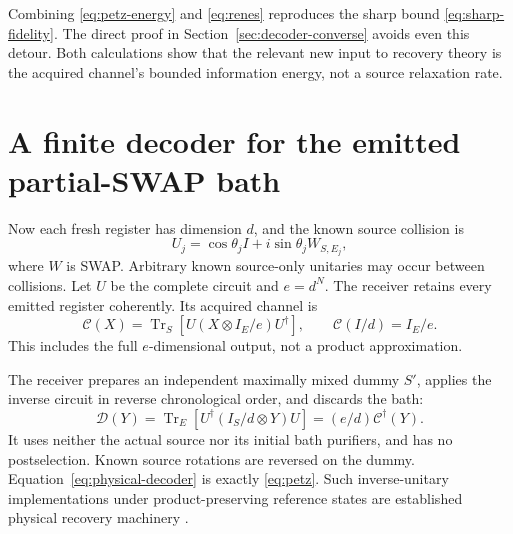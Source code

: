 \documentclass[11pt]{article}
\numberwithin{equation}{section}
\theoremstyle{remark}
\newcommand{\Tr}{\operatorname{Tr}}
\newcommand{\Ccal}{\mathcal C}
\newcommand{\Dcal}{\mathcal D}
\begin{document}
Combining \eqref{eq:petz-energy} and \eqref{eq:renes} reproduces the sharp
bound \eqref{eq:sharp-fidelity}. The direct proof in
Section~\ref{sec:decoder-converse} avoids even this detour. Both calculations
show that the relevant new input to recovery theory is the acquired
channel's bounded information energy, not a source relaxation rate.

\section{A finite decoder for the emitted partial-SWAP bath}
\label{sec:partial-swap}
Now each fresh register has dimension \(d\), and the known source collision is
\begin{equation}
 U_j=\cos\theta_j I+i\sin\theta_j W_{S,E_j},
 \label{eq:partial-swap}
\end{equation}
where \(W\) is SWAP. Arbitrary known source-only unitaries may occur between
collisions. Let \(U\) be the complete circuit and \(e=d^N\).
The receiver retains every emitted register coherently. Its acquired channel is
\begin{equation}
 \Ccal(X)=\Tr_S[U(X\otimes I_E/e)U^\dagger],
 \qquad \Ccal(I/d)=I_E/e.
 \label{eq:exact-acquired}
\end{equation}
This includes the full \(e\)-dimensional output, not a product approximation.

The receiver prepares an independent maximally mixed dummy \(S'\), applies
the inverse circuit in reverse chronological order, and discards the bath:
\begin{equation}
 \Dcal(Y)=\Tr_E[U^\dagger(I_S/d\otimes Y)U]
         =(e/d)\Ccal^\dagger(Y).
 \label{eq:physical-decoder}
\end{equation}
It uses neither the actual source nor its initial bath purifiers, and has
no postselection. Known source rotations are reversed on the dummy.
Equation~\eqref{eq:physical-decoder} is exactly \eqref{eq:petz}.
Such inverse-unitary implementations under product-preserving reference
states are established physical recovery machinery \cite{Aw,Song}.
\end{document}
